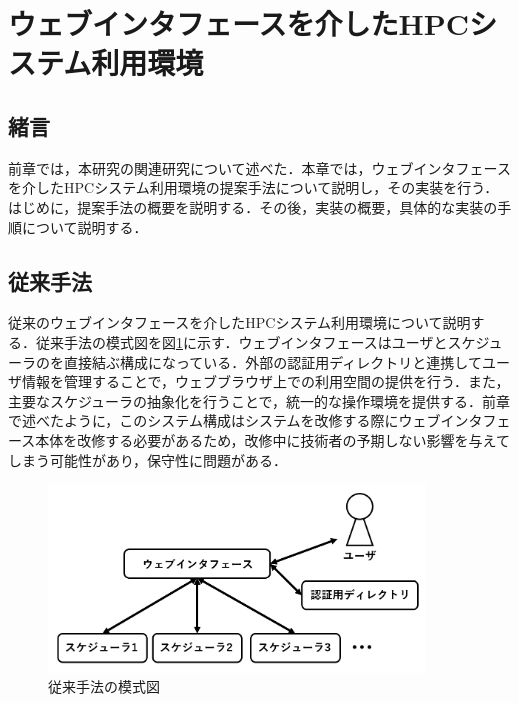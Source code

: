 
\section{ウェブインタフェースを介したHPCシステム利用環境}

\subsection{緒言}
前章では，本研究の関連研究について述べた．本章では，ウェブインタフェースを介したHPCシステム利用環境の提案手法について説明し，その実装を行う．はじめに，提案手法の概要を説明する．その後，実装の概要，具体的な実装の手順について説明する．\par

\subsection{従来手法}
従来のウェブインタフェースを介したHPCシステム利用環境について説明する．従来手法の模式図を図\ref{fig5}に示す．ウェブインタフェースはユーザとスケジューラのを直接結ぶ構成になっている．外部の認証用ディレクトリと連携してユーザ情報を管理することで，ウェブブラウザ上での利用空間の提供を行う．また，主要なスケジューラの抽象化を行うことで，統一的な操作環境を提供する．前章で述べたように，このシステム構成はシステムを改修する際にウェブインタフェース本体を改修する必要があるため，改修中に技術者の予期しない影響を与えてしまう可能性があり，保守性に問題がある．\par

\begin{figure}[tb]
    \centering
    \includegraphics[width=100mm]{./fig/conventional_method.png}
    \caption{従来手法の模式図}
    \label{fig5}
\end{figure}

